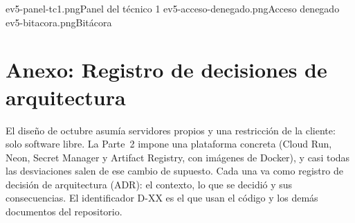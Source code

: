 \documentclass[11pt,a4paper]{article}
\theoremstyle{definition}
\theoremstyle{remark}
\begin{document}
{ev5-panel-tc1.png}{Panel del técnico 1}
{ev5-acceso-denegado.png}{Acceso denegado}
{ev5-bitacora.png}{Bitácora}

\clearpage
\appendix
{}
\section{Anexo: Registro de decisiones de arquitectura}
\label{anx:adr}

El diseño de octubre asumía servidores propios y una restricción de la
cliente: solo software libre. La Parte~2 impone una plataforma concreta
(Cloud Run, Neon, Secret Manager y Artifact Registry, con imágenes de Docker),
y casi todas las desviaciones salen de ese cambio de supuesto. Cada una va
como registro de decisión de arquitectura (ADR): el contexto, lo que se
decidió y sus consecuencias. El identificador D-XX es el que usan el código
y los demás documentos del repositorio.

\newcommand{\adr}[2]{\subsection*{ADR #1. #2}}
\newcommand{\adrctx}{\textbf{Contexto.}\ }
\newcommand{\adrdec}{\par\smallskip\textbf{Decisión.}\ }
\newcommand{\adrpos}{\par\smallskip\textbf{Consecuencias positivas.}}
\newcommand{\adrneg}{\par\smallskip\textbf{Consecuencias negativas.}}
\end{document}
